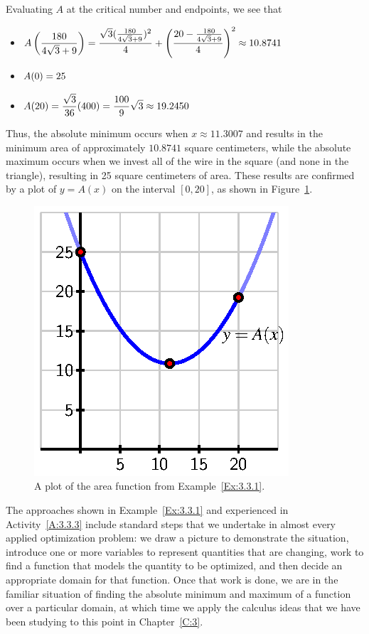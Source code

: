 Evaluating $A$ at the critical number and endpoints, we see that
\begin{itemize}
	\item $\displaystyle A\left(\frac{180}{4\sqrt{3}+9}\right) = \frac{\sqrt{3}(\frac{180}{4\sqrt{3}+9})^2}{4} + \left( \frac{20-\frac{180}{4\sqrt{3}+9}}{4} \right)^2 \approx 10.8741$
	\item $\displaystyle A(0) = 25$
	\item $\displaystyle A(20) = \frac{\sqrt{3}}{36}(400) = \frac{100}{9} \sqrt{3} \approx 19.2450$
\end{itemize}
Thus, the absolute minimum occurs when $x \approx 11.3007$ and results in the minimum area of approximately $10.8741$ square centimeters, while the absolute maximum occurs when we invest all of the wire in the square (and none in the triangle), resulting in 25 square centimeters of area.  These results are confirmed by a plot of $y = A(x)$ on the interval $[0,20]$, as shown in Figure~\ref{F:3.3.Ex1Plot}.
\begin{figure}[h]
\begin{center}
\includegraphics{figures/3_3_Ex1Plot.eps} 
\caption{A plot of the area function from Example~\ref{Ex:3.3.1}.} \label{F:3.3.Ex1Plot}
\end{center}
\end{figure}
\afterex



The approaches shown in Example~\ref{Ex:3.3.1} and experienced in Activity~\ref{A:3.3.3} include standard steps that we undertake in almost every applied optimization problem:  we draw a picture to demonstrate the situation, introduce one or more variables to represent quantities that are changing, work to find a function that models the quantity to be optimized, and then decide an appropriate domain for that function.  Once that work is done, we are in the familiar situation of finding the absolute minimum and maximum of a function over a particular domain, at which time we apply the calculus ideas that we have been studying to this point in Chapter~\ref{C:3}.

